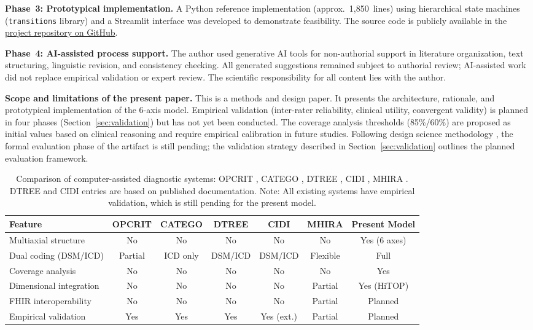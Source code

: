 \documentclass[11pt,a4paper]{article}
\begin{document}
\textbf{Phase~3: Prototypical implementation.} A Python reference implementation (approx.\ 1,850~lines) using hierarchical state machines (\texttt{transitions} library) and a Streamlit interface was developed to demonstrate feasibility. The source code is publicly available in the \href{https://github.com/um-bruch/multiaxial-diagnostic-system}{project repository on GitHub}.

\textbf{Phase~4: AI-assisted process support.} The author used generative AI tools for non-authorial support in literature organization, text structuring, linguistic revision, and consistency checking. All generated suggestions remained subject to authorial review; AI-assisted work did not replace empirical validation or expert review. The scientific responsibility for all content lies with the author.

\textbf{Scope and limitations of the present paper.} This is a methods and design paper. It presents the architecture, rationale, and prototypical implementation of the 6-axis model. Empirical validation (inter-rater reliability, clinical utility, convergent validity) is planned in four phases (Section~\ref{sec:validation}) but has not yet been conducted. The coverage analysis thresholds (85\%/60\%) are proposed as initial values based on clinical reasoning and require empirical calibration in future studies. Following design science methodology \citep{Hevner2004, Peffers2007}, the formal evaluation phase of the artifact is still pending; the validation strategy described in Section~\ref{sec:validation} outlines the planned evaluation framework.

\begin{table}[ht]
\centering
\caption{Comparison of computer-assisted diagnostic systems: OPCRIT \citep{McGuffin1991}, CATEGO \citep{Wing1974}, DTREE \citep{First1993}, CIDI \citep{Kessler2004}, MHIRA \citep{Stasiak2023}. DTREE and CIDI entries are based on published documentation. Note: All existing systems have empirical validation, which is still pending for the present model.}
\footnotesize
\begin{tabularx}{\textwidth}{@{}Y *{6}{C}@{}}
\toprule
Feature & OPCRIT & CATEGO & DTREE & CIDI & MHIRA & Present Model \\
\midrule
Multiaxial structure & No & No & No & No & No & Yes (6 axes) \\
Dual coding (DSM/ICD) & Partial & ICD only & DSM/ICD & DSM/ICD & Flexible & Full \\
Coverage analysis & No & No & No & No & No & Yes \\
Dimensional integration & No & No & No & No & Partial & Yes (HiTOP) \\
FHIR interoperability & No & No & No & No & Partial & Planned \\
Empirical validation & Yes & Yes & Yes & Yes (ext.) & Partial & Planned \\
\bottomrule
\end{tabularx}
\normalsize
\label{tab:comparison}
\end{table}
\end{document}
